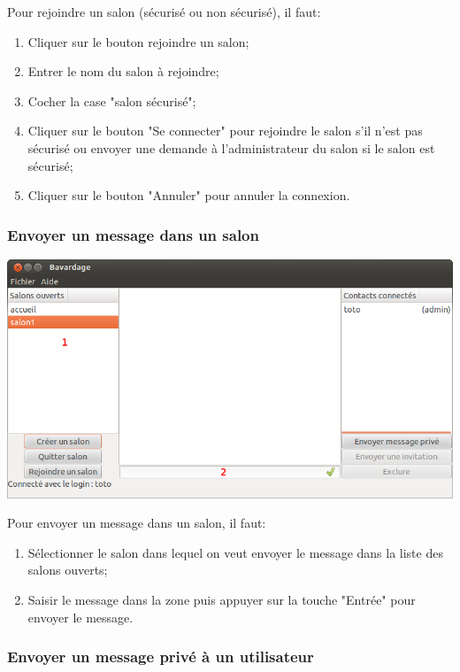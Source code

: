 \documentclass[a4paper,11pt,french]{book}
\begin{document}
Pour rejoindre un salon (sécurisé ou non sécurisé), il faut:

\begin{enumerate}
    \item Cliquer sur le bouton rejoindre un salon;
    \item Entrer le nom du salon à rejoindre;
    \item Cocher la case "salon sécurisé";
    \item Cliquer sur le bouton "Se connecter" pour rejoindre le salon s'il n'est pas sécurisé ou envoyer une demande à l'administrateur du salon si le salon est sécurisé;
    \item Cliquer sur le bouton "Annuler" pour annuler la connexion.
\end{enumerate}

\subsubsection{Envoyer un message dans un salon}

\includegraphics[width=45em]{capture/mess_room.png}

Pour envoyer un message dans un salon, il faut:
\begin{enumerate}
    \item Sélectionner le salon dans lequel on veut envoyer le message dans la liste des salons ouverts;
    \item Saisir le message dans la zone puis appuyer sur la touche "Entrée" pour envoyer le message.
\end{enumerate}

\subsubsection{Envoyer un message privé à un utilisateur}
\end{document}
